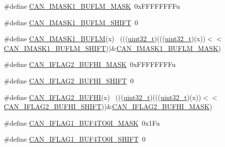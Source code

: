 \begin{DoxyCompactItemize}
\item 
\#define \hyperlink{group___c_a_n___register___masks_ga1cb2f8a12349b014999ace58cd7600c6}{C\+A\+N\+\_\+\+I\+M\+A\+S\+K1\+\_\+\+B\+U\+F\+L\+M\+\_\+\+M\+A\+SK}~0x\+F\+F\+F\+F\+F\+F\+F\+Fu
\item 
\#define \hyperlink{group___c_a_n___register___masks_gac50c90f8a89aa464399090953c634b8a}{C\+A\+N\+\_\+\+I\+M\+A\+S\+K1\+\_\+\+B\+U\+F\+L\+M\+\_\+\+S\+H\+I\+FT}~0
\item 
\#define \hyperlink{group___c_a_n___register___masks_gae725b30b1ffe087ecf0a1e36e9feb0b0}{C\+A\+N\+\_\+\+I\+M\+A\+S\+K1\+\_\+\+B\+U\+F\+LM}(x)                                        ~(((\hyperlink{_p_e___types_8h_a33594304e786b158f3fb30289278f5af}{uint32\+\_\+t})(((\hyperlink{_p_e___types_8h_a33594304e786b158f3fb30289278f5af}{uint32\+\_\+t})(x))$<$$<$\hyperlink{group___c_a_n___register___masks_gac50c90f8a89aa464399090953c634b8a}{C\+A\+N\+\_\+\+I\+M\+A\+S\+K1\+\_\+\+B\+U\+F\+L\+M\+\_\+\+S\+H\+I\+FT}))\&\hyperlink{group___c_a_n___register___masks_ga1cb2f8a12349b014999ace58cd7600c6}{C\+A\+N\+\_\+\+I\+M\+A\+S\+K1\+\_\+\+B\+U\+F\+L\+M\+\_\+\+M\+A\+SK})
\item 
\#define \hyperlink{group___c_a_n___register___masks_ga20dcde29d52484685d8b0c2bb9ba2ad7}{C\+A\+N\+\_\+\+I\+F\+L\+A\+G2\+\_\+\+B\+U\+F\+H\+I\+\_\+\+M\+A\+SK}~0x\+F\+F\+F\+F\+F\+F\+F\+Fu
\item 
\#define \hyperlink{group___c_a_n___register___masks_gaf26eb008c22bfc3871ef7cb6d87c7774}{C\+A\+N\+\_\+\+I\+F\+L\+A\+G2\+\_\+\+B\+U\+F\+H\+I\+\_\+\+S\+H\+I\+FT}~0
\item 
\#define \hyperlink{group___c_a_n___register___masks_ga0f3fdf56f15e5cc9a4bf7c37a4ca8fff}{C\+A\+N\+\_\+\+I\+F\+L\+A\+G2\+\_\+\+B\+U\+F\+HI}(x)                                        ~(((\hyperlink{_p_e___types_8h_a33594304e786b158f3fb30289278f5af}{uint32\+\_\+t})(((\hyperlink{_p_e___types_8h_a33594304e786b158f3fb30289278f5af}{uint32\+\_\+t})(x))$<$$<$\hyperlink{group___c_a_n___register___masks_gaf26eb008c22bfc3871ef7cb6d87c7774}{C\+A\+N\+\_\+\+I\+F\+L\+A\+G2\+\_\+\+B\+U\+F\+H\+I\+\_\+\+S\+H\+I\+FT}))\&\hyperlink{group___c_a_n___register___masks_ga20dcde29d52484685d8b0c2bb9ba2ad7}{C\+A\+N\+\_\+\+I\+F\+L\+A\+G2\+\_\+\+B\+U\+F\+H\+I\+\_\+\+M\+A\+SK})
\item 
\#define \hyperlink{group___c_a_n___register___masks_ga7cae7a414b6cbda0bfd1750a793ef044}{C\+A\+N\+\_\+\+I\+F\+L\+A\+G1\+\_\+\+B\+U\+F4\+T\+O0\+I\+\_\+\+M\+A\+SK}~0x1\+Fu
\item 
\#define \hyperlink{group___c_a_n___register___masks_gac55369b6f357dd331ed5c9557eeddb40}{C\+A\+N\+\_\+\+I\+F\+L\+A\+G1\+\_\+\+B\+U\+F4\+T\+O0\+I\+\_\+\+S\+H\+I\+FT}~0

\end{DoxyCompactItemize}
